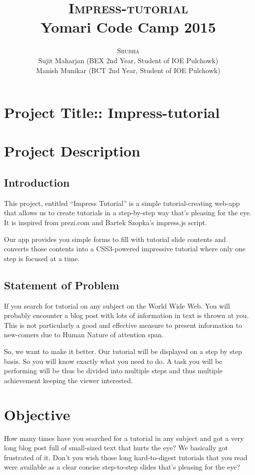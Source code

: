 \documentclass[12pt,a4paper]{article}
\title{
    {\Huge{\textsc{Impress-tutorial}}}\\
    {\Large{Yomari Code Camp 2015}}
}
\author{
    {\textsc{Shubha}} \\ 
    {\small{Sujit Maharjan (BEX 2nd Year, Student of IOE Pulchowk)}} \\ 
    {\small{Manish Munikar (BCT 2nd Year, Student of IOE Pulchowk)}}
}
\begin{document}
\maketitle

\section{Project Title:: Impress-tutorial}

\section{Project Description}

\subsection{Introduction}

This project, entitled “Impress Tutorial” is a simple tutorial-creating web-app that allows us to create tutorials in a step-by-step way that's pleasing for the eye. It is inspired from prezi.com and Bartek Szopka's impress.js script.

Our app provides you simple forms to fill with tutorial slide contents and converts those contents into a CSS3-powered impressive tutorial where only one step is focused at a time.

\subsection{Statement of Problem}

If you search for tutorial on any subject on the World Wide Web. You will probably encounter a blog post with lots of information in text is thrown at you. This is not particularly a good and effective measure to present information to new-comers due to Human Nature of attention span.

So, we want to make it better. Our tutorial will be displayed on a step by step basis. So you will know exactly what you need to do. A task you will be performing will be thus be divided into multiple steps and thus multiple achievement keeping the viewer interested. 

\section{Objective}

How many times have you searched for a tutorial in any subject and got a very long blog post full of small-sized text that hurts the eye? We basically got frustrated of it. Don't you wish those long hard-to-digest tutorials that you read were available as a clear concise step-to-step slides that's pleasing for the eye?
\end{document}
